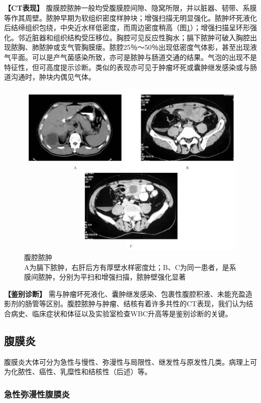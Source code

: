 \textbf{【CT表现】}
腹膜腔脓肿一般均受腹膜腔间隙、隐窝所限，并以脏器、韧带、系膜等作其周壁。脓肿早期为软组织密度样肿块；增强扫描无明显强化。脓肿坏死液化后结缔组织包绕，中央近水样低密度，而周边密度稍高（图\ref{fig18-4}）；增强扫描呈环形强化。邻近脏器和组织结构受压移位。胸腔可见反应性胸水；膈下脓肿可破入胸腔出现脓胸、肺脓肿或支气管胸膜瘘。脓腔25％～50％出现低密度气体影，甚至出现液气平面。可以是产气菌感染所致，亦可是脓肿与肠道交通的结果。气泡的出现不是特征性，但可高度提示诊断。类似的表现亦可见于肿瘤坏死或囊肿继发感染或与肠道沟通时，肿块内偶见气体。

\begin{figure}[!htbp]
 \centering
 \includegraphics[width=.7\textwidth,height=\textheight,keepaspectratio]{./images/Image00373.jpg}
 \captionsetup{justification=centering}
 \caption{腹腔脓肿\\{\small A为膈下脓肿，右肝后方有厚壁水样密度灶；B、C为同一患者，是系膜间脓肿，分别为平扫和增强扫描，脓肿壁强化显著}}
 \label{fig18-4}
  \end{figure} 

\textbf{【鉴别诊断】}
需与肿瘤坏死液化、囊肿继发感染、包裹性腹腔积液、未能充盈造影剂的肠管等区别。腹腔脓肿与肿瘤、结核有着许多共性的CT表现，我们认为结合病史、临床症状和体征以及实验室检查WBC升高等是鉴别诊断的关键。

\subsection{腹膜炎}

腹膜炎大体可分为急性与慢性、弥漫性与局限性、继发性与原发性几类。病理上可为化脓性、癌性、乳糜性和结核性（后述）等。

\subsubsection{急性弥漫性腹膜炎}

